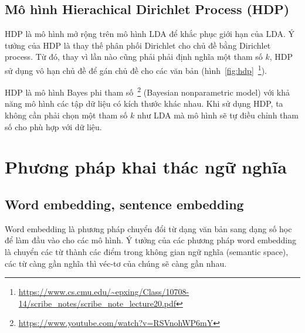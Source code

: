 


\subsection{Mô hình Hierachical Dirichlet Process (HDP)}
\acrshort{HDP} là mô hình mở rộng trên mô hình \acrshort{LDA} để khắc phục giới hạn của \acrshort{LDA}. Ý tưởng của \acrshort{HDP} là thay thế phân phối Dirichlet cho chủ đề bằng Dirichlet process. Từ đó, thay vì lần nào cũng phải phải định nghĩa một tham số $k$, \acrshort{HDP} sử dụng vô hạn chủ đề để gán chủ đề cho các văn bản (hình~\ref{fig:hdp}~\footnote{\url{https://www.cs.cmu.edu/~epxing/Class/10708-14/scribe_notes/scribe_note_lecture20.pdf}}).

\acrshort{HDP} là mô hình Bayes phi tham số~\footnote{\url{https://www.youtube.com/watch?v=RSVnohWP6mY}} (Bayesian nonparametric model) với khả năng mô hình các tập dữ liệu có kích thước khác nhau. Khi sử dụng \acrshort{HDP}, ta không cần phải chọn một tham số $k$ như \acrshort{LDA} mà mô hình sẽ tự điều chỉnh tham số cho phù hợp với dữ liệu.

\section{Phương pháp khai thác ngữ nghĩa}
\subsection{Word embedding, sentence embedding}
Word embedding là phương pháp chuyển đổi từ dạng văn bản sang dạng số học để làm đầu vào cho các mô hình. Ý tưởng của các phương pháp word embedding là chuyển các từ thành các điểm trong không gian ngữ nghĩa (semantic space), các từ càng gần nghĩa thì véc-tơ của chúng sẽ càng gần nhau.

